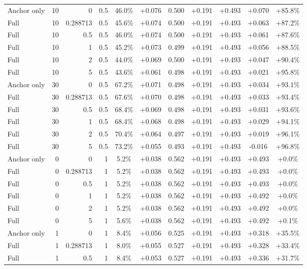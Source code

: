 \begin{table}[htbp]
\begin{tabular}{lrrrccccccc}
Anchor only & 10 & 0 & 0.5 & 46.0\% & +0.076 & 0.500 & +0.191 & +0.493 & +0.070 & +85.8\% \\
Full & 10 & 0.288713 & 0.5 & 45.6\% & +0.074 & 0.500 & +0.191 & +0.493 & +0.063 & +87.2\% \\
Full & 10 & 0.5 & 0.5 & 46.0\% & +0.074 & 0.500 & +0.191 & +0.493 & +0.061 & +87.6\% \\
Full & 10 & 1 & 0.5 & 45.2\% & +0.073 & 0.499 & +0.191 & +0.493 & +0.056 & +88.5\% \\
Full & 10 & 2 & 0.5 & 44.0\% & +0.069 & 0.500 & +0.191 & +0.493 & +0.047 & +90.4\% \\
Full & 10 & 5 & 0.5 & 43.6\% & +0.061 & 0.498 & +0.191 & +0.493 & +0.021 & +95.8\% \\
Anchor only & 30 & 0 & 0.5 & 67.2\% & +0.071 & 0.498 & +0.191 & +0.493 & +0.034 & +93.1\% \\
Full & 30 & 0.288713 & 0.5 & 67.6\% & +0.070 & 0.498 & +0.191 & +0.493 & +0.033 & +93.4\% \\
Full & 30 & 0.5 & 0.5 & 68.4\% & +0.069 & 0.498 & +0.191 & +0.493 & +0.031 & +93.6\% \\
Full & 30 & 1 & 0.5 & 68.4\% & +0.068 & 0.498 & +0.191 & +0.493 & +0.029 & +94.1\% \\
Full & 30 & 2 & 0.5 & 70.4\% & +0.064 & 0.497 & +0.191 & +0.493 & +0.019 & +96.1\% \\
Full & 30 & 5 & 0.5 & 73.2\% & +0.055 & 0.493 & +0.191 & +0.493 & -0.016 & +96.8\% \\
Anchor only & 0 & 0 & 1 & 5.2\% & +0.038 & 0.562 & +0.191 & +0.493 & +0.493 & +0.0\% \\
Full & 0 & 0.288713 & 1 & 5.2\% & +0.038 & 0.562 & +0.191 & +0.493 & +0.493 & +0.0\% \\
Full & 0 & 0.5 & 1 & 5.2\% & +0.038 & 0.562 & +0.191 & +0.493 & +0.493 & +0.0\% \\
Full & 0 & 1 & 1 & 5.2\% & +0.038 & 0.562 & +0.191 & +0.493 & +0.492 & +0.0\% \\
Full & 0 & 2 & 1 & 5.2\% & +0.038 & 0.562 & +0.191 & +0.493 & +0.492 & +0.0\% \\
Full & 0 & 5 & 1 & 5.6\% & +0.038 & 0.562 & +0.191 & +0.493 & +0.492 & +0.1\% \\
Anchor only & 1 & 0 & 1 & 8.4\% & +0.056 & 0.525 & +0.191 & +0.493 & +0.318 & +35.5\% \\
Full & 1 & 0.288713 & 1 & 8.0\% & +0.055 & 0.527 & +0.191 & +0.493 & +0.328 & +33.4\% \\
Full & 1 & 0.5 & 1 & 8.4\% & +0.053 & 0.527 & +0.191 & +0.493 & +0.336 & +31.7\% \\

\end{tabular}
\end{table}
